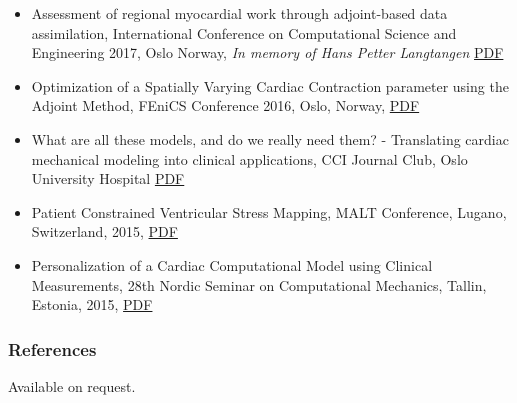 \documentclass[11pt, a4paper]{article}
\begin{document}
\begin{raggedright}
\begin{itemize}
\item
  Assessment of regional myocardial work through adjoint-­based data
  assimilation, International Conference on Computational Science and
  Engineering 2017, Oslo Norway, \emph{In memory of Hans Petter
  Langtangen} \href{/assets/talks/CSE251017.pdf}{PDF}
\item
  Optimization of a Spatially Varying Cardiac Contraction parameter
  using the Adjoint Method, FEniCS Conference 2016, Oslo, Norway,
  \href{/assets/talks/fenics2016.pdf}{PDF}
\item
  What are all these models, and do we really need them? - Translating
  cardiac mechanical modeling into clinical applications, CCI Journal
  Club, Oslo University Hospital
  \href{/assets/talks/journal_club270317.pdf}{PDF}
\item
  Patient Constrained Ventricular Stress Mapping, MALT Conference,
  Lugano, Switzerland, 2015, \href{/assets/talks/malt010515.pdf}{PDF}
\item
  Personalization of a Cardiac Computational Model using Clinical
  Measurements, 28th Nordic Seminar on Computational Mechanics, Tallin,
  Estonia, 2015, \href{/assets/talks/nscm_2015.pdf}{PDF}
\end{itemize}

\hypertarget{references}{%
\subsubsection{References}\label{references}}

Available on request.
\end{raggedright}
\end{document}
